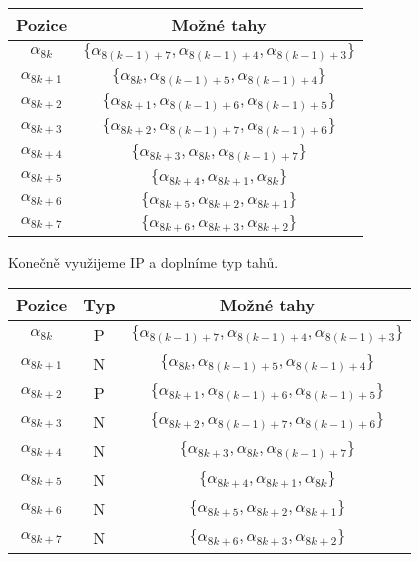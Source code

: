 \documentclass[../main.tex]{subfiles}
\begin{document}
\begin{center}
    \begin{tabular}{|c|c|}
        \hline
        Pozice &  Možné tahy \\
        \hline
        $\alpha_{8k}$ & $\{ \alpha_{8(k-1)+7},  \alpha_{8(k-1)+4}, \alpha_{8(k-1)+3} \}$ \\
        \hline
        $\alpha_{8k+1}$  & $\{ \alpha_{8k},  \alpha_{8(k-1)+5}, \alpha_{8(k-1)+4} \}$ \\
        \hline
        $\alpha_{8k+2}$ & $\{ \alpha_{8k+1},  \alpha_{8(k-1)+6}, \alpha_{8(k-1)+5} \}$ \\
        \hline
        $\alpha_{8k+3}$  & $\{ \alpha_{8k+2},  \alpha_{8(k-1)+7}, \alpha_{8(k-1)+6} \}$ \\
        \hline
        $\alpha_{8k+4}$  & $\{ \alpha_{8k+3},  \alpha_{8k}, \alpha_{8(k-1)+7} \}$ \\
        \hline
        $\alpha_{8k+5}$  & $\{ \alpha_{8k+4},  \alpha_{8k+1}, \alpha_{8k} \}$ \\
        \hline
        $\alpha_{8k+6}$  & $\{ \alpha_{8k+5},  \alpha_{8k+2}, \alpha_{8k+1} \}$ \\
        \hline
        $\alpha_{8k+7}$ & $\{ \alpha_{8k+6},  \alpha_{8k+3}, \alpha_{8k+2} \}$ \\
        \hline
    \end{tabular}

\end{center}


Konečně využijeme IP a doplníme typ tahů.

\begin{center}
    \begin{tabular}{|c|c|c|}
        \hline
        Pozice & Typ & Možné tahy \\
        \hline
        $\alpha_{8k}$ & P & $\{ \alpha_{8(k-1)+7},  \alpha_{8(k-1)+4}, \alpha_{8(k-1)+3} \}$ \\
        \hline
        $\alpha_{8k+1}$ & N & $\{ \alpha_{8k},  \alpha_{8(k-1)+5}, \alpha_{8(k-1)+4} \}$ \\
        \hline
        $\alpha_{8k+2}$ & P & $\{ \alpha_{8k+1},  \alpha_{8(k-1)+6}, \alpha_{8(k-1)+5} \}$ \\
        \hline
        $\alpha_{8k+3}$ & N & $\{ \alpha_{8k+2},  \alpha_{8(k-1)+7}, \alpha_{8(k-1)+6} \}$ \\
        \hline
        $\alpha_{8k+4}$ & N & $\{ \alpha_{8k+3},  \alpha_{8k}, \alpha_{8(k-1)+7} \}$ \\
        \hline
        $\alpha_{8k+5}$ & N & $\{ \alpha_{8k+4},  \alpha_{8k+1}, \alpha_{8k} \}$ \\
        \hline
        $\alpha_{8k+6}$ & N & $\{ \alpha_{8k+5},  \alpha_{8k+2}, \alpha_{8k+1} \}$ \\
        \hline
        $\alpha_{8k+7}$ & N & $\{ \alpha_{8k+6},  \alpha_{8k+3}, \alpha_{8k+2} \}$ \\
        \hline
    \end{tabular}

\end{center}
\end{document}
